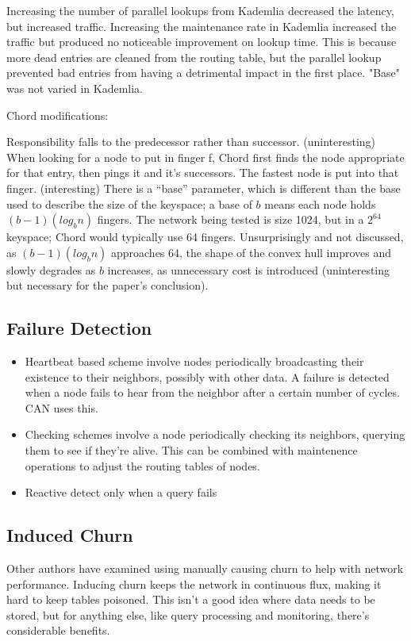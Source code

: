\documentclass[10pt,letterpaper]{report}
\begin{document}
Increasing the number of parallel lookups from Kademlia decreased the latency, but increased traffic.  Increasing the maintenance rate in Kademlia increased the traffic but produced no noticeable improvement on lookup time.  This is because more dead entries are cleaned from the routing table, but the parallel lookup prevented bad entries from having a detrimental impact in the first place.  "Base" was not varied in Kademlia.

Chord modifications:  

Responsibility falls to the predecessor rather than successor.   (uninteresting)
When looking for a node to put in finger f, Chord first finds the node appropriate for that entry, then pings it and it's successors.  The fastest node is put into that finger.  (interesting)
There is a ``base'' parameter, which is different than the base used to describe the size of the keyspace;  a base of $b$ means each node  holds $(b-1)(log_b n)$ fingers.  The network being tested is size 1024, but in a $2^64$ keyspace;  Chord would typically use 64 fingers.   Unsurprisingly and not discussed, as $(b-1)(log_b n)$ approaches 64, the shape of the convex hull improves and slowly degrades as $b$ increases, as unnecessary cost is introduced  (uninteresting but necessary for the paper's conclusion).


\subsection{Failure Detection}

\begin{itemize}
	\item Heartbeat based scheme involve nodes periodically broadcasting their existence to their neighbors, possibly with other data.  A failure is detected when a node fails to hear from the neighbor after a certain number of cycles.  CAN uses this.
	\item Checking schemes involve a node periodically checking its neighbors, querying them to see if they're alive.  This can be combined with maintenence operations to adjust the routing tables of nodes.
	\item Reactive detect only when a query fails
\end{itemize}

\subsection{Induced Churn}

Other authors have examined using manually causing  churn to help with network performance.
Inducing churn keeps the network in continuous flux, making it hard to keep tables poisoned.   This isn't a good idea where data needs to be stored, but for anything else, like query processing and monitoring, there's considerable benefits. 
\end{document}
